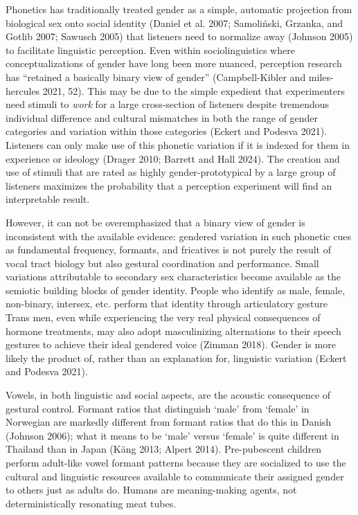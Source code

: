 \documentclass[
  letterpaper,
  DIV=11,
  numbers=noendperiod]{scrartcl}
\begin{document}
Phonetics has traditionally treated gender as a simple, automatic
projection from biological sex onto social identity (Daniel et al. 2007;
Samoliński, Grzanka, and Gotlib 2007; Sawusch 2005) that listeners need
to normalize away (Johnson 2005) to facilitate linguistic perception.
Even within sociolinguistics where conceptualizations of gender have
long been more nuanced, perception research has ``retained a basically
binary view of gender'' (Campbell-Kibler and miles-hercules 2021, 52).
This may be due to the simple expedient that experimenters need stimuli
to \emph{work} for a large cross-section of listeners despite tremendous
individual difference and cultural mismatches in both the range of
gender categories and variation within those categories (Eckert and
Podesva 2021). Listeners can only make use of this phonetic variation if
it is indexed for them in experience or ideology (Drager 2010; Barrett
and Hall 2024). The creation and use of stimuli that are rated as highly
gender-prototypical by a large group of listeners maximizes the
probability that a perception experiment will find an interpretable
result.

However, it can not be overemphasized that a binary view of gender is
inconsistent with the available evidence: gendered variation in such
phonetic cues as fundamental frequency, formants, and fricatives is not
purely the result of vocal tract biology but also gestural coordination
and performance. Small variations attributable to secondary sex
characteristics become available as the semiotic building blocks of
gender identity. People who identify as male, female, non-binary,
intersex, etc. perform that identity through articulatory gesture Trans
men, even while experiencing the very real physical consequences of
hormone treatments, may also adopt masculinizing alternations to their
speech gestures to achieve their ideal gendered voice (Zimman 2018).
Gender is more likely the product of, rather than an explanation for,
linguistic variation (Eckert and Podesva 2021).

Vowels, in both linguistic and social aspects, are the acoustic
consequence of gestural control. Formant ratios that distinguish `male'
from `female' in Norwegian are markedly different from formant ratios
that do this in Danish (Johnson 2006); what it means to be `male' versus
`female' is quite different in Thailand than in Japan (Käng 2013; Alpert
2014). Pre-pubescent children perform adult-like vowel formant patterns
because they are socialized to use the cultural and linguistic resources
available to communicate their assigned gender to others just as adults
do. Humans are meaning-making agents, not deterministically resonating
meat tubes.
\end{document}
